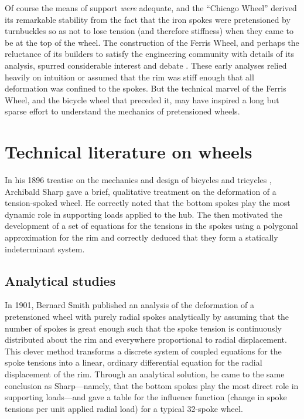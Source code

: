 \documentclass[../thesis.tex]{subfiles}
\begin{document}
Of course the means of support \emph{were} adequate, and the ``Chicago Wheel'' derived its remarkable stability from the fact that the iron spokes were pretensioned by turnbuckles so as not to lose tension (and therefore stiffness) when they came to be at the top of the wheel. The construction of the Ferris Wheel, and perhaps the reluctance of its builders to satisfy the engineering community with details of its analysis, spurred considerable interest and debate \cite{Searles1893}. These early analyses relied heavily on intuition or assumed that the rim was stiff enough that all deformation was confined to the spokes. But the technical marvel of the Ferris Wheel, and the bicycle wheel that preceded it, may have inspired a long but sparse effort to understand the mechanics of pretensioned wheels.


\section{Technical literature on wheels}


In his 1896 treatise on the mechanics and design of bicycles and tricycles \cite{Sharp1977}, Archibald Sharp gave a brief, qualitative treatment on the deformation of a tension-spoked wheel. He correctly noted that the bottom spokes play the most dynamic role in supporting loads applied to the hub. The then motivated the development of a set of equations for the tensions in the spokes using a polygonal approximation for the rim and correctly deduced that they form a statically indeterminant system.

\subsection{Analytical studies}

In 1901, Bernard Smith \cite{Smith1901} published an analysis of the deformation of a pretensioned wheel with purely radial spokes analytically by assuming that the number of spokes is great enough such that the spoke tension is continuously distributed about the rim and everywhere proportional to radial displacement. This clever method transforms a discrete system of coupled equations for the spoke tensions into a linear, ordinary differential equation for the radial displacement of the rim. Through an analytical solution, he came to the same conclusion as Sharp---namely, that the bottom spokes play the most direct role in supporting loads---and gave a table for the influence function (change in spoke tensions per unit applied radial load) for a typical 32-spoke wheel.
\end{document}

